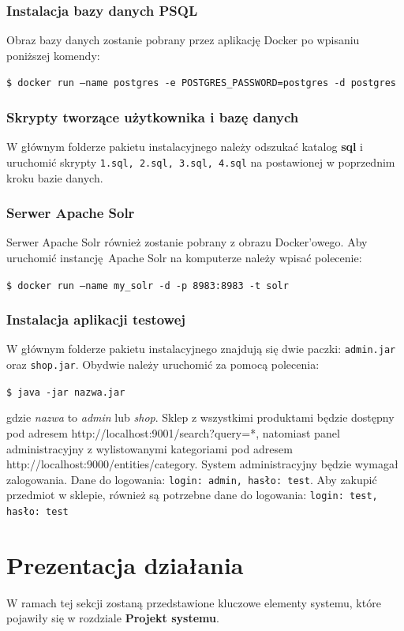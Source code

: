 \subsubsection{Instalacja bazy danych PSQL}
Obraz bazy danych zostanie pobrany przez aplikację Docker po wpisaniu poniższej komendy: 

\noindent
\texttt{\$ docker run --name postgres -e POSTGRES\_PASSWORD=postgres -d postgres}

\subsubsection{Skrypty tworzące użytkownika i bazę danych}
W głównym folderze pakietu instalacyjnego należy odszukać katalog \textbf{sql} i uruchomić skrypty \texttt{1.sql, 2.sql, 3.sql, 4.sql} na postawionej w poprzednim kroku bazie danych.

\subsubsection{Serwer Apache Solr}
Serwer Apache Solr również zostanie pobrany z obrazu Docker'owego. Aby uruchomić instancję Apache Solr na komputerze należy wpisać polecenie: 

\noindent
\texttt{\$ docker run --name my\_solr -d -p 8983:8983 -t solr}



\subsubsection{Instalacja aplikacji testowej}
W głównym folderze pakietu instalacyjnego znajdują się dwie paczki: \texttt{admin.jar} oraz \texttt{shop.jar}. Obydwie należy uruchomić za pomocą polecenia: 

\noindent
\texttt{\$ java -jar nazwa.jar}

\noindent
gdzie \textit{nazwa} to \textit{admin} lub \textit{shop}. Sklep z wszystkimi produktami będzie dostępny pod adresem http://localhost:9001/search?query=*, natomiast panel administracyjny z wylistowanymi kategoriami pod adresem http://localhost:9000/entities/category. System administracyjny będzie wymagał zalogowania. Dane do logowania: \texttt{login: admin, hasło: test}. Aby zakupić przedmiot w sklepie, również są potrzebne dane do logowania: \texttt{login: test, hasło: test}

\section{Prezentacja działania}
W ramach tej sekcji zostaną przedstawione kluczowe elementy systemu, które pojawiły się w rozdziale \textbf{Projekt systemu}.  

